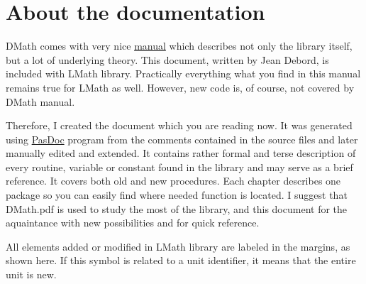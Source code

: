 \documentclass[12pt,a4paper,oneside]{report}
\newcommand{\lmath}[1]{   %
	\marginpar{\vspace{#1} 
		\begin{flushright}
			LMath
	\end{flushright} }
}
\begin{document}
\section*{About the documentation} 
DMath comes with very nice \href{DMath.pdf}{manual} which describes not only the library itself, but a lot of underlying theory. This document, written by Jean Debord, is included with LMath library. Practically everything what you find in this manual remains true for LMath as well. However, new code is, of course, not covered by DMath manual. 

Therefore, I created the document which you are reading now. It was generated using \href{https://sourceforge.net/projects/pasdoc/}{PasDoc} program from the comments contained in the source files and later manually edited and extended. It contains rather formal and terse description of every routine, variable or constant found in the library and may serve as a brief reference. It covers both old and new procedures. Each chapter describes one package so you can easily find where needed function is located. I suggest that DMath.pdf is used to study the most of the library, and this document for the aquaintance with new possibilities and for quick reference.

All elements added or modified in LMath library are labeled in the margins, as shown here. If this symbol is related to a unit identifier, it means that the entire unit is new. \lmath{-28pt} 
\end{document}
